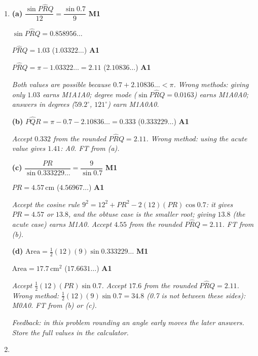 \documentclass[12pt, twoside]{article}
\begin{document}
\begin{enumerate}[itemsep=0.3cm]
\item[2.] [Maximum mark: 8]

\textbf{(a)} $\dfrac{\sin P\hat{R}Q}{12} = \dfrac{\sin 0.7}{9}$ \hfill \textbf{M1}

$\sin P\hat{R}Q = 0.858956\ldots$

$P\hat{R}Q = 1.03$ \quad ($1.03322\ldots$) \hfill \textbf{A1}

$P\hat{R}Q = \pi - 1.03322\ldots = 2.11$ \quad ($2.10836\ldots$) \hfill \textbf{A1}

\emph{Both values are possible because $0.7 + 2.10836\ldots < \pi$. Wrong
methods: giving only $1.03$ earns M1A1A0; degree mode ($\sin P\hat{R}Q =
0.0163$) earns M1A0A0; answers in degrees ($59.2^\circ$, $121^\circ$) earn
M1A0A0.}

\textbf{(b)} $P\hat{Q}R = \pi - 0.7 - 2.10836\ldots = 0.333$ \quad ($0.333229\ldots$) \hfill \textbf{A1}

\emph{Accept $0.332$ from the rounded $P\hat{R}Q = 2.11$. Wrong method:
using the acute value gives $1.41$: A0. FT from (a).}

\textbf{(c)} $\dfrac{PR}{\sin 0.333229\ldots} = \dfrac{9}{\sin 0.7}$ \hfill \textbf{M1}

$PR = 4.57\,\text{cm}$ \quad ($4.56967\ldots$) \hfill \textbf{A1}

\emph{Accept the cosine rule $9^{2} = 12^{2} + PR^{2} - 2(12)(PR)\cos 0.7$:
it gives $PR = 4.57$ or $13.8$, and the obtuse case is the smaller root;
giving $13.8$ (the acute case) earns M1A0. Accept $4.55$ from the rounded
$P\hat{R}Q = 2.11$. FT from (b).}

\textbf{(d)} $\text{Area} = \frac{1}{2}(12)(9)\sin 0.333229\ldots$ \hfill \textbf{M1}

$\text{Area} = 17.7\,\text{cm}^{2}$ \quad ($17.6631\ldots$) \hfill \textbf{A1}

\emph{Accept $\frac{1}{2}(12)(PR)\sin 0.7$. Accept $17.6$ from the rounded
$P\hat{R}Q = 2.11$. Wrong method: $\frac{1}{2}(12)(9)\sin 0.7 = 34.8$ (0.7
is not between these sides): M0A0. FT from (b) or (c).}

\emph{Feedback: in this problem rounding an angle early moves the later
answers. Store the full values in the calculator.}

\newpage

\item[3.] [Maximum mark: 9]


\end{enumerate}
\end{document}
